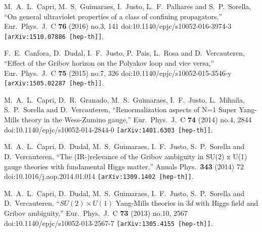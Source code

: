 \documentclass[a4paper,11pt,british,twosides]{book}%
\numberwithin{equation}{section}
\begin{document}

\begin{thebibliography}{9}



  M.~A.~L.~Capri, M.~S.~Guimaraes, I.~Justo, L.~F.~Palhares and S.~P.~Sorella,
  ``On general ultraviolet properties of a class of confining propagators,''
  Eur.\ Phys.\ J.\ C {\bf 76} (2016) no.3,  141
  doi:10.1140/epjc/s10052-016-3974-3
  {\tt [arXiv:1510.07886 [hep-th]]}.

  F.~E.~Canfora, D.~Dudal, I.~F.~Justo, P.~Pais, L.~Rosa and D.~Vercauteren,
  ``Effect of the Gribov horizon on the Polyakov loop and vice versa,''
  Eur.\ Phys.\ J.\ C {\bf 75} (2015) no.7,  326
  doi:10.1140/epjc/s10052-015-3546-y
  {\tt [arXiv:1505.02287 [hep-th]]}.

  M.~A.~L.~Capri, D.~R.~Granado, M.~S.~Guimaraes, I.~F.~Justo, L.~Mihaila, S.~P.~Sorella and
  D.~Vercauteren,
  ``Renormalization aspects of N=1 Super Yang-Mills theory in the Wess-Zumino gauge,''
  Eur.\ Phys.\ J.\ C {\bf 74} (2014) no.4,  2844
  doi:10.1140/epjc/s10052-014-2844-0
  {\tt [arXiv:1401.6303 [hep-th]]}.

  M.~A.~L.~Capri, D.~Dudal, M.~S.~Guimaraes, I.~F.~Justo, S.~P.~Sorella and D.~Vercauteren,
  ``The (IR-)relevance of the Gribov ambiguity in SU(2) x U(1) gauge theories with fundamental
  Higgs matter,''
  Annals Phys.\  {\bf 343} (2014) 72
  doi:10.1016/j.aop.2014.01.014
  {\tt [arXiv:1309.1402 [hep-th]]}.

  M.~A.~L.~Capri, D.~Dudal, M.~S.~Guimaraes, I.~F.~Justo, S.~P.~Sorella and D.~Vercauteren,
  ``$SU(2) \times U(1)$ Yang-Mills theories in $3d$ with Higgs field and Gribov ambiguity,''
  Eur.\ Phys.\ J.\ C {\bf 73} (2013) no.10,  2567
  doi:10.1140/epjc/s10052-013-2567-7
  {\tt [arXiv:1305.4155 [hep-th]]}.


\end{thebibliography}
\end{document}
